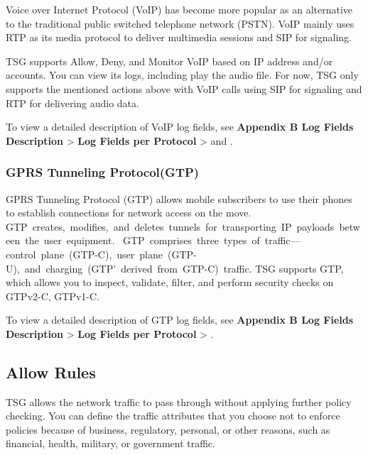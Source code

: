 Voice over Internet Protocol (VoIP) has become more popular as an alternative to the traditional public switched telephone network (PSTN). 
VoIP mainly uses RTP as its media protocol to deliver multimedia sessions and SIP for signaling.


TSG supports Allow, Deny, and Monitor VoIP based on IP address and/or accounts. You can view its logs, including play the audio file. 
For now, TSG only supports the mentioned actions above with VoIP calls using SIP for signaling and RTP for delivering audio data.


To view a detailed description of VoIP log fields, see \textbf{Appendix B Log Fields Description} > \textbf{Log Fields per Protocol} > \textbf{\hyperlink{link:SIP}{\color{linkblue}{SIP}}} and \textbf{\hyperlink{link:RTP}{\color{linkblue}{RTP}}}.

\subsubsection*{\hypertarget{link:GPRS Tunneling Protocol(GTP)}{GPRS Tunneling Protocol(GTP)}}
\label{sec:policies:security:filter:gtp}

GPRS Tunneling Protocol (GTP) allows mobile subscribers to use their phones to establish connections for network access on the move. 
GTP creates, modifies, and deletes tunnels for transporting IP payloads between the user equipment. 
GTP comprises three types of traffic—control plane (GTP-C), user plane (GTP-U), and charging (GTP’ derived from GTP-C) traffic.
TSG supports GTP, which allows you to inspect, validate, filter, and perform security checks on GTPv2-C, GTPv1-C. 

To view a detailed description of GTP log fields, see \textbf{Appendix B Log Fields Description} > \textbf{Log Fields per Protocol} > \textbf{\hyperlink{link:GTP-C}{\color{linkblue}{GTP-C}}}.

\subsection*{\hypertarget{link:Allow Rules}{Allow Rules}}
\label{sec:policies:security:allow}

TSG allows the network traffic to pass through without applying further policy checking. You can define the traffic attributes that you choose not to enforce policies because of business, 
regulatory, personal, or other reasons, such as financial, health, military, or government traffic. 


